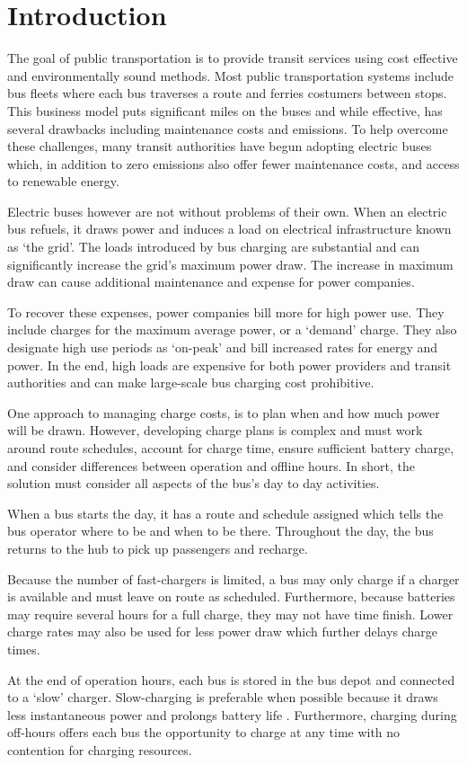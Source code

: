 \section{Introduction}
The goal of public transportation is to provide transit services using cost effective and environmentally sound methods. Most public transportation systems include bus fleets where each bus traverses a route and ferries costumers between stops. This business model puts significant miles on the buses and while effective, has several drawbacks including maintenance costs and emissions. To help overcome these challenges, many transit authorities have begun adopting electric buses which, in addition to zero emissions also offer fewer maintenance costs, and access to renewable energy\cite{poornesh_comparative_2020}.
\par Electric buses however are not without problems of their own. When an electric bus refuels, it draws power and induces a load on electrical infrastructure known as `the grid'. The loads introduced by bus charging are substantial and can significantly increase the grid's maximum power draw\cite{stahleder_impact_2019}\cite{deb_impact_2017}\cite{boonraksa_impact_2019}. The increase in maximum draw can cause additional maintenance and expense for power companies. 
\par To recover these expenses, power companies bill more for high power use.  They include charges for the maximum average power, or a `demand' charge.  They also designate high use periods as `on-peak' and bill increased rates for energy and power. In the end, high loads are expensive for both power providers and transit authorities and can make large-scale bus charging cost prohibitive. 
\par One approach to managing charge costs, is to plan when and how much power will be drawn.  However, developing charge plans is complex and must work around route schedules, account for charge time, ensure sufficient battery charge, and consider differences between operation and offline hours.  In short, the solution must consider all aspects of the bus's day to day activities.
\par When a bus starts the day, it has a route and schedule assigned which tells the bus operator where to be and when to be there. Throughout the day, the bus returns to the hub to pick up passengers and recharge. 
\par Because the number of fast-chargers is limited, a bus may only charge if a charger is available and must leave on route as scheduled. Furthermore, because batteries may require several hours for a full charge, they may not have time finish. Lower charge rates may also be used for less power draw which further delays charge times. 
\par At the end of operation hours, each bus is stored in the bus depot and connected to a `slow' charger.  Slow-charging is preferable when possible because it draws less instantaneous power and prolongs battery life \cite{houbbadi_optimal_2019}.  Furthermore, charging during off-hours offers each bus the opportunity to charge at any time with no contention for charging resources.
\par 

